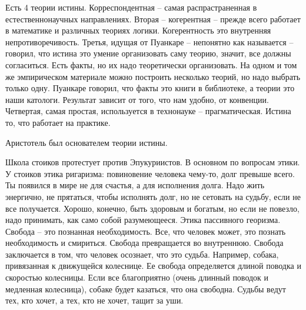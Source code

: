 \documentclass[a4paper, 12pt]{article}
\begin{document}
Есть 4 теории истины. Корреспондентная -- самая распрастраненная в естественнонаучных направлениях. Вторая -- когерентная -- прежде всего работает в математике и различных теориях логики. Когерентность это внутренняя непротиворечивость. Третья, идущая от Пуанкаре -- непонятно как называется -- говорил, что истина это умение организовать саму теорию, значит, все должны согласиться. Есть факты, но их надо теоретически организовать. На одном и том же эмпирическом материале можно построить несколько теорий, но надо выбрать только одну. Пуанкаре говорил, что факты это книги в библиотеке, а теории это наши катологи. Результат зависит от того, что нам удобно, от конвенции. Четвертая, самая простая, используется в технонауке -- прагматическая. Истина то, что работает на практике. 

Аристотель был основателем теории истины. 

Школа стоиков протестует против Эпукуриистов. В основном по вопросам этики. У стоиков этика ригаризма: повиновение человека чему-то, долг превыше всего. Ты появился в мире не для счастья, а для исполнения долга. Надо жить энергично, не прятаться, чтобы исполнять долг, но не сетовать на судьбу, если не все получается. Хорошо, конечно, быть здоровым и богатым, но если не повезло, надо принимать, как само собой разумеющееся. Этика пассивного георизма. Свобода -- это познанная необходимость. Все, что человек может, это познать необходимость и смириться. Свобода превращается во внутреннюю. Свобода заключается в том, что человек осознает, что это судьба. Например, собака, привязанная к движущейся колеснице. Ее свобода определяется длиной поводка и скоростью колесницы. Если все благоприятно (очень длинный поводок и медленная колесница), собаке будет казаться, что она свободна. Судьбы ведут тех, кто хочет, а тех, кто не хочет, тащит за уши. 
\end{document}
